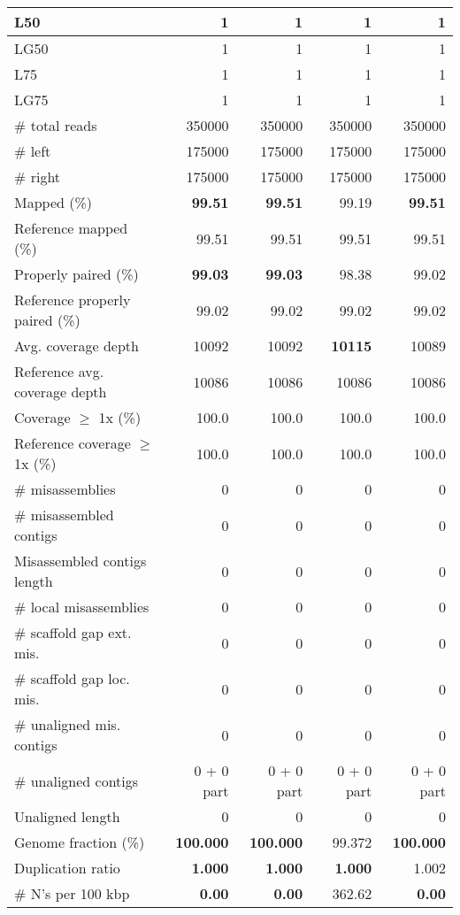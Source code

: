 \documentclass[12pt,a4paper]{article}
\begin{document}
\begin{table}[ht]
\begin{center}
\begin{tabular}{|l*{4}{|r}|}
L50 & 1 & 1 & 1 & 1 \\ \hline
LG50 & 1 & 1 & 1 & 1 \\ \hline
L75 & 1 & 1 & 1 & 1 \\ \hline
LG75 & 1 & 1 & 1 & 1 \\ \hline
\# total reads & 350000 & 350000 & 350000 & 350000 \\ \hline
\# left & 175000 & 175000 & 175000 & 175000 \\ \hline
\# right & 175000 & 175000 & 175000 & 175000 \\ \hline
Mapped (\%) & {\bf 99.51} & {\bf 99.51} & 99.19 & {\bf 99.51} \\ \hline
Reference mapped (\%) & 99.51 & 99.51 & 99.51 & 99.51 \\ \hline
Properly paired (\%) & {\bf 99.03} & {\bf 99.03} & 98.38 & 99.02 \\ \hline
Reference properly paired (\%) & 99.02 & 99.02 & 99.02 & 99.02 \\ \hline
Avg. coverage depth & 10092 & 10092 & {\bf 10115} & 10089 \\ \hline
Reference avg. coverage depth & 10086 & 10086 & 10086 & 10086 \\ \hline
Coverage $\geq$ 1x (\%) & 100.0 & 100.0 & 100.0 & 100.0 \\ \hline
Reference coverage $\geq$ 1x (\%) & 100.0 & 100.0 & 100.0 & 100.0 \\ \hline
\# misassemblies & 0 & 0 & 0 & 0 \\ \hline
\# misassembled contigs & 0 & 0 & 0 & 0 \\ \hline
Misassembled contigs length & 0 & 0 & 0 & 0 \\ \hline
\# local misassemblies & 0 & 0 & 0 & 0 \\ \hline
\# scaffold gap ext. mis. & 0 & 0 & 0 & 0 \\ \hline
\# scaffold gap loc. mis. & 0 & 0 & 0 & 0 \\ \hline
\# unaligned mis. contigs & 0 & 0 & 0 & 0 \\ \hline
\# unaligned contigs & 0 + 0 part & 0 + 0 part & 0 + 0 part & 0 + 0 part \\ \hline
Unaligned length & 0 & 0 & 0 & 0 \\ \hline
Genome fraction (\%) & {\bf 100.000} & {\bf 100.000} & 99.372 & {\bf 100.000} \\ \hline
Duplication ratio & {\bf 1.000} & {\bf 1.000} & {\bf 1.000} & 1.002 \\ \hline
\# N's per 100 kbp & {\bf 0.00} & {\bf 0.00} & 362.62 & {\bf 0.00} \\ \hline

\end{tabular}
\end{center}
\end{table}
\end{document}
